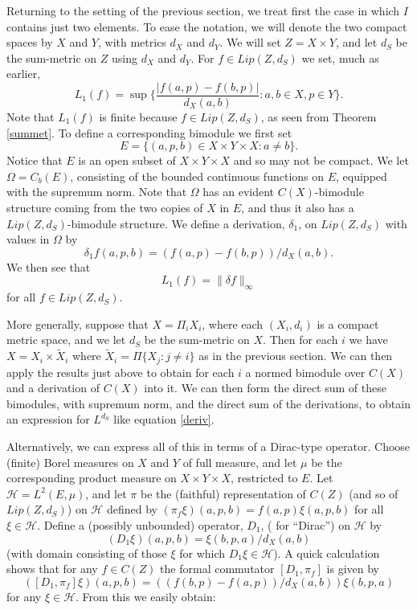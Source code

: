 \documentclass{amsart}[14pt]
\theoremstyle{definition}
\theoremstyle{remark}
\newcommand{\cH}{{\mathcal H}}
\renewcommand{\d}{\delta}
\renewcommand{\O}{\Omega}
\newcommand{\<}{\langle}
\renewcommand{\>}{\rangle}
\numberwithin{equation}{section}
\begin{document}
{Returning to the setting of the previous section, we
treat first the case in which $I$ contains just two elements. To
ease the notation, we will denote the two compact spaces by
$X$ and $Y$, with metrics $d_X$ and $d_Y$. We will set
$Z =X \times Y$, and let $d_S$ be the sum-metric on $Z$
using  $d_X$ and $d_Y$. 
For $f \in Lip(Z, d_S)$ we set, much as earlier,
\[
L_1(f) = \sup\{\frac{|f(a,p) - f(b,p)|}{d_X(a,b)}: a,b \in X, p \in Y\}  .
\]
Note that $L_1(f)$ is finite because $f \in Lip(Z, d_S)$,
as seen from Theorem \ref{summet}.
To define a corresponding bimodule we first set  
\[
E = \{ (a,p,b) \in X \times Y \times X: a \neq b\} .
\]
Notice that $E$ is an open subset of $ X \times Y \times X$ and
so may not be compact. We let $\O = C_b(E)$, 
consisting of the bounded continuous functions on $ E $,
equipped with the supremum norm.
Note that $\O$ has an
evident $C(X)$-bimodule structure coming from the two
copies of $X$ in $E$, and thus it also has a $Lip(Z, d_S)$-bimodule
structure. We define a derivation, $\d_1$, on $Lip(Z, d_S)$
with values in $\O$ by
\[
\d_1 f(a, p, b)  = (f(a,p) - f(b,p))/d_X(a,b)  .
\]
We then see that
\begin{equation}
\label{deriv}
L_1(f) = \| \d f\|_\infty      
\end{equation}
for all $f \in Lip(Z, d_S)$.

More generally,  suppose that $X = \Pi_i X_i$, where each
$(X_i, d_i)$ is a compact
metric space,
and we let $d_S$
be the sum-metric on $X$. Then for each $i$ we have
$X = X_i \times \tilde X_i$ where $\tilde X_i = \Pi \{X_j: j \neq i\}$ 
as in the previous section. We can then apply the results just above
to obtain for each $i$ a normed bimodule over $C(X)$ and a
derivation of $C(X)$ into it. We can then form the direct sum
of these bimodules, with supremum norm, and the direct sum
of the derivations, to obtain an expression for $L^{d_S}$ like
equation \ref{deriv}.

Alternatively, we can express all of this in terms of a Dirac-type
operator. Choose (finite) Borel measures on $X$ and $Y$
of full measure,
and let $\mu$ be the corresponding product measure
on $X \times Y \times X$, restricted to $E$.
Let $\cH = L^2(E, \mu)$, and let $\pi$ be the (faithful) representation
of $C(Z)$ (and so of $Lip(Z, d_S)$) 
on $\cH$ defined by $(\pi_f \xi)(a,p,b) = f(a,p)\xi(a,p,b)$ 
for all $\xi \in \cH$. Define a (possibly unbounded) operator, $D_1$,
( for ``Dirac'') on $\cH$ by
\[
(D_1\xi)(a, p, b) = \xi(b,p,a)/d_X(a,b)   
\]
(with domain consisting of those $\xi$ for which $D_1\xi \in \cH$).
A quick calculation shows that for any 
$f \in C(Z)$ the formal commutator $[D_1, \pi_f]$
is given by
\[
([D_1, \pi_f]\xi)(a,p,b) =  ((f(b,p) - f(a,p))/d_X(a,b))\xi(b,p, a)  
\]
for any $\xi \in \cH$. From this we easily obtain:

}
\end{document}
